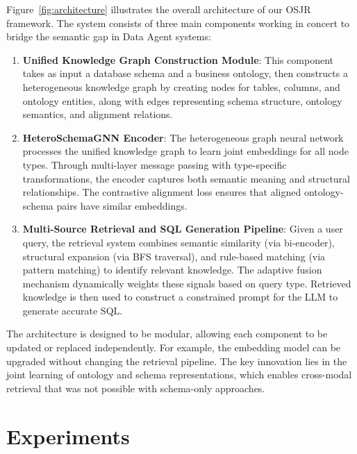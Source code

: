 \documentclass[sigconf, nonatbib]{acmart}
\begin{document}
Figure~\ref{fig:architecture} illustrates the overall architecture of our OSJR framework. The system consists of three main components working in concert to bridge the semantic gap in Data Agent systems:

\begin{enumerate}
    \item \textbf{Unified Knowledge Graph Construction Module}: This component takes as input a database schema and a business ontology, then constructs a heterogeneous knowledge graph by creating nodes for tables, columns, and ontology entities, along with edges representing schema structure, ontology semantics, and alignment relations.
    
    \item \textbf{HeteroSchemaGNN Encoder}: The heterogeneous graph neural network processes the unified knowledge graph to learn joint embeddings for all node types. Through multi-layer message passing with type-specific transformations, the encoder captures both semantic meaning and structural relationships. The contrastive alignment loss ensures that aligned ontology-schema pairs have similar embeddings.
    
    \item \textbf{Multi-Source Retrieval and SQL Generation Pipeline}: Given a user query, the retrieval system combines semantic similarity (via bi-encoder), structural expansion (via BFS traversal), and rule-based matching (via pattern matching) to identify relevant knowledge. The adaptive fusion mechanism dynamically weights these signals based on query type. Retrieved knowledge is then used to construct a constrained prompt for the LLM to generate accurate SQL.
\end{enumerate}

The architecture is designed to be modular, allowing each component to be updated or replaced independently. For example, the embedding model can be upgraded without changing the retrieval pipeline. The key innovation lies in the joint learning of ontology and schema representations, which enables cross-modal retrieval that was not possible with schema-only approaches.


\section{Experiments}
\label{sec:experiments}
\end{document}
